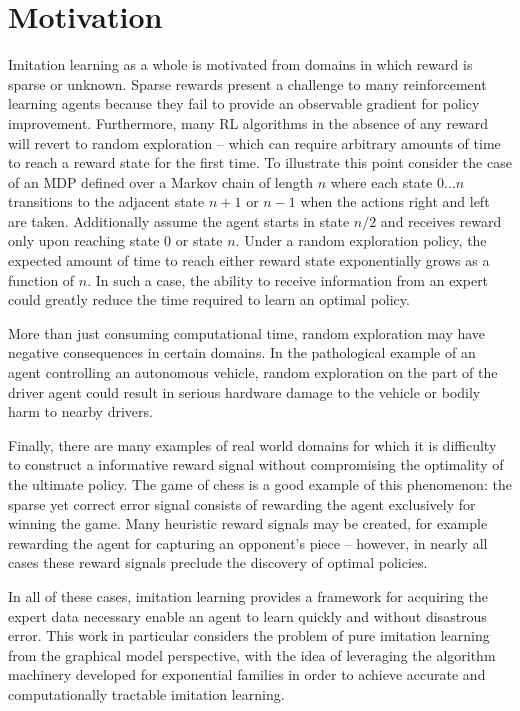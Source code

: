 \documentclass{article} %
\begin{document}
\section{Motivation}
Imitation learning as a whole is motivated from domains in which reward is sparse or unknown. Sparse rewards present a challenge to many reinforcement learning agents because they fail to provide an observable gradient for policy improvement. Furthermore, many RL algorithms in the absence of any reward will revert to random exploration -- which can require arbitrary amounts of time to reach a reward state for the first time. To illustrate this point consider the case of an MDP defined over a Markov chain of length $n$ where each state $0...n$ transitions to the adjacent state $n+1$ or $n-1$ when the actions right and left are taken. Additionally assume the agent starts in state $n/2$ and receives reward only upon reaching state $0$ or state $n$. Under a random exploration policy, the expected amount of time to reach either reward state exponentially grows as a function of $n$. In such a case, the ability to receive information from an expert could greatly reduce the time required to learn an optimal policy. 

More than just consuming computational time, random exploration may have negative consequences in certain domains. In the pathological example of an agent controlling an autonomous vehicle, random exploration on the part of the driver agent could result in serious hardware damage to the vehicle or bodily harm to nearby drivers.

Finally, there are many examples of real world domains for which it is difficulty to construct a informative reward signal without compromising the optimality of the ultimate policy. The game of chess is a good example of this phenomenon: the sparse yet correct error signal consists of rewarding the agent exclusively for winning the game. Many heuristic reward signals may be created, for example rewarding the agent for capturing an opponent's piece -- however, in nearly all cases these reward signals preclude the discovery of optimal policies.

In all of these cases, imitation learning provides a framework for acquiring the expert data necessary enable an agent to learn quickly and without disastrous error. This work in particular considers the problem of pure imitation learning from the graphical model perspective, with the idea of leveraging the algorithm machinery developed for exponential families in order to achieve accurate and computationally tractable imitation learning.
\end{document}
